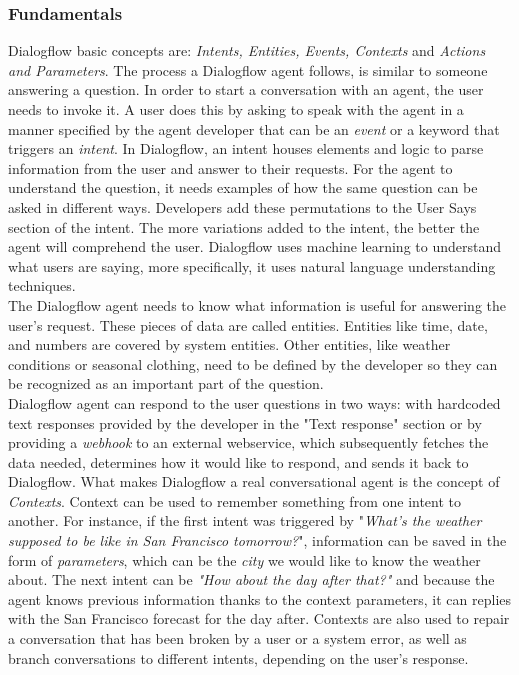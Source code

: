 \documentclass[b5paper,10pt,twoside,cucitura]{toptesi}
\begin{document}
\subsubsection{Fundamentals}

Dialogflow basic concepts are: \textit{Intents, Entities, Events, Contexts} and \textit{Actions and Parameters}. The process a Dialogflow agent follows, is similar to someone answering a question. In order to start a conversation with an agent, the user needs to invoke it. A user does this by asking to speak with the agent in a manner specified by the agent developer that can be an \textit{event} or a keyword that triggers an \textit{intent}. In Dialogflow, an intent houses elements and logic to parse information from the user and answer to their requests. For the agent to understand the question, it needs examples of how the same question can be asked in different ways. Developers add these permutations to the User Says section of the intent. The more variations added to the intent, the better the agent will comprehend the user. Dialogflow uses machine learning to understand what users are saying, more specifically, it uses natural language understanding techniques.
\\
\noindent
The Dialogflow agent needs to know what information is useful for answering the user's request. These pieces of data are called entities. Entities like time, date, and numbers are covered by system entities. Other entities, like weather conditions or seasonal clothing, need to be defined by the developer so they can be recognized as an important part of the question.
\\
\noindent
Dialogflow agent can respond to the user questions in two ways: with hardcoded text responses provided by the developer in the "Text response" section or by providing a \textit{webhook} to an external webservice, which subsequently fetches the data needed, determines how it would like to respond, and sends it back to Dialogflow. What makes Dialogflow a real conversational agent is the concept of \textit{Contexts}. Context can be used to remember something from one intent to another. For instance, if the first intent was triggered by "\textit{What's the weather supposed to be like in San Francisco tomorrow?}", information can be saved in the form of \textit{parameters}, which can be the \textit{city} we would like to know the weather about. The next intent can be \textit{"How about the day after that?"} and because the agent knows previous information thanks to the context parameters, it can replies with the San Francisco forecast for the day after. Contexts are also used to repair a conversation that has been broken by a user or a system error, as well as branch conversations to different intents, depending on the user's response. 
\end{document}
